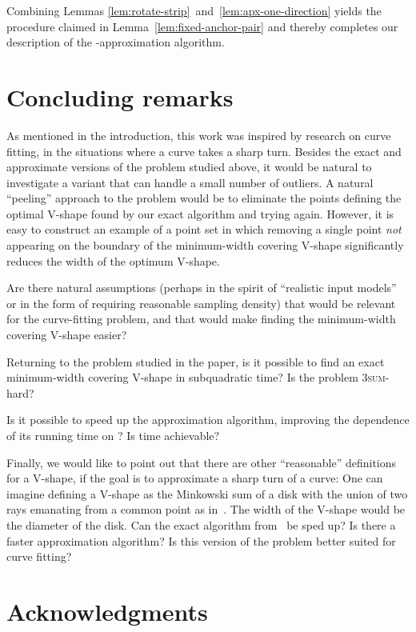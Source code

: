 \documentclass{llncs}
\begin{document}
Combining Lemmas
\ref{lem:rotate-strip}~and~\ref{lem:apx-one-direction} yields the
procedure claimed in Lemma~\ref{lem:fixed-anchor-pair} and thereby
completes our description of the -approximation algorithm.



\section{Concluding remarks}\label{sec:conclusion}

As mentioned in the introduction, this work was inspired by research
on curve fitting, in the situations where a curve takes a sharp turn.
Besides the exact and approximate versions of the problem studied
above, it would be natural to investigate a variant that can handle 
a small number of outliers.  A natural ``peeling''
approach to the problem would be to eliminate the points defining the
optimal V-shape found by our exact algorithm and trying again.
However, it is easy to construct an example of a point set in which
removing a single point \emph{not} appearing on the boundary of the
minimum-width covering V-shape significantly reduces the width of the
optimum V-shape.


Are there natural assumptions (perhaps in the spirit of ``realistic
input models''~\cite{realistic-input-models} or in the form of
requiring reasonable sampling density) that would be relevant for the
curve-fitting problem, and that would make finding the minimum-width covering
V-shape easier?

Returning to the problem studied in the paper, is it possible to find
an exact minimum-width covering V-shape in subquadratic time?  Is the
problem \textsc{3sum}-hard?  

Is it possible to speed up the approximation algorithm, improving the
dependence of its running time on ?
Is time  achievable?

Finally, we would like to point out that there are other
``reasonable'' definitions for a V-shape, if the goal is to
approximate a sharp turn of a curve: One can imagine defining a
V-shape as the Minkowski sum of a disk with the union of two rays
emanating from a common point as in~\cite{GKS}.  
The width of the
V-shape would be the diameter of the disk.  Can the exact algorithm
from~\cite{GKS} be sped up?  Is there a faster approximation
algorithm?  Is this version of the problem better suited for curve
fitting?

\section*{Acknowledgments}
\end{document}
